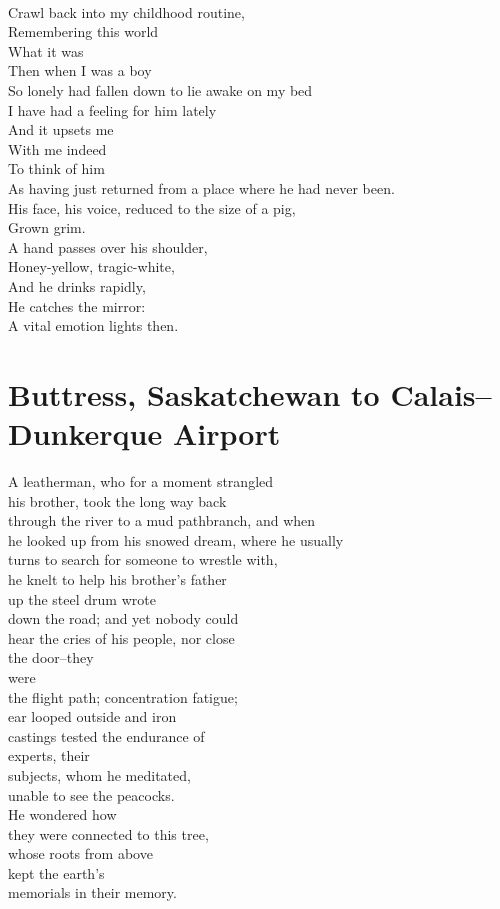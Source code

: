 \documentclass[smalldemyvopaper,11pt,twoside,onecolumn,openright,extrafontsizes]{memoir}
\begin{document}
\\Crawl back into my childhood routine,
\\Remembering this world
\\What it was
\\Then when I was a boy
\\So lonely had fallen down to lie awake on my bed
\\I have had a feeling for him lately
\\And it upsets me
\\With me indeed
\\To think of him
\\As having just returned from a place where he had never been.
\\His face, his voice, reduced to the size of a pig,
\\Grown grim.
\\A hand passes over his shoulder,
\\Honey-yellow, tragic-white,
\\And he drinks rapidly,
\\He catches the mirror:
\\A vital emotion lights then.



\chapter{Buttress, Saskatchewan to Calais–Dunkerque Airport}
A leatherman, who for a moment strangled
\\his brother, took the long way back
\\through the river to a mud pathbranch, and when
\\he looked up from his snowed dream, where he usually
\\turns to search for someone to wrestle with,
\\he knelt to help his brother's father
\\up the steel drum wrote
\\down the road; and yet nobody could
\\hear the cries of his people, nor close
\\the door--they
\\were
\\the flight path; concentration fatigue;
\\ear looped outside and iron
\\castings tested the endurance of
\\experts, their
\\subjects, whom he meditated,
\\unable to see the peacocks.
\\He wondered how
\\they were connected to this tree,
\\whose roots from above
\\kept the earth's
\\memorials in their memory.
\end{document}
